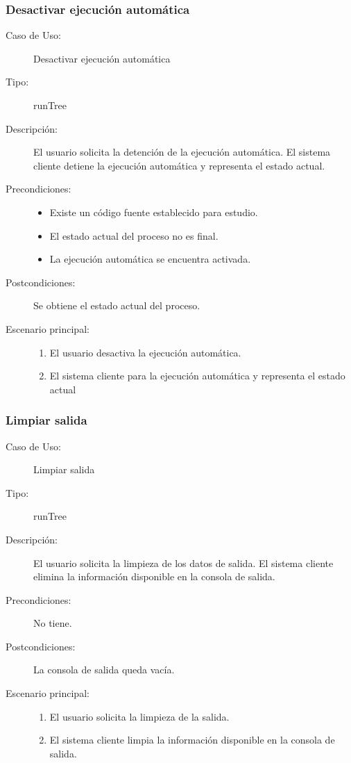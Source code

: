 \subsubsection{Desactivar ejecución automática} 

\begin{description}
   \item[Caso de Uso:] Desactivar ejecución automática
   \item [Tipo:] runTree
   \item[Descripción:] 
   El usuario solicita la detención de la ejecución automática. 
   El sistema cliente detiene la ejecución automática y representa el estado actual.
   \item[Precondiciones:] \hfill 
   \begin{itemize}
   \item Existe un código fuente establecido para estudio. 
   \item El estado actual del proceso no es final.
   \item La ejecución automática se encuentra activada.
   \end{itemize}
   \item[Postcondiciones:] 
   Se obtiene el estado actual del proceso.
   \item[Escenario principal:] \hfill
   \begin{enumerate}
   \item El usuario desactiva la ejecución automática.
   \item El sistema cliente para la ejecución automática y representa el estado actual 
   \end{enumerate}
\end{description}


\subsubsection{Limpiar salida} 

\begin{description}
   \item[Caso de Uso:] Limpiar salida
   \item [Tipo:] runTree
   \item[Descripción:] 
   El usuario solicita la limpieza de los datos de salida. 
   El sistema cliente elimina la información disponible en la consola de salida.
   \item[Precondiciones:]
   No tiene.
   \item[Postcondiciones:] 
   La consola de salida queda vacía.
   \item[Escenario principal:] \hfill
   \begin{enumerate}
   \item El usuario solicita la limpieza de la salida.
   \item El sistema cliente limpia la información disponible en la consola de salida.  
   \end{enumerate}
\end{description}


